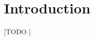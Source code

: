 \documentclass{article}
\begin{document}
	\maketitle %

	\thispagestyle{fancy} %



	\begin{abstract}
		\noindent [TODO ].
	\end{abstract}



	\section{Introduction}
	\label{sec:intro}

			\paragraph{}
			[TODO ]



	\nocite{subject:taa}
	
  
  
\end{document}
